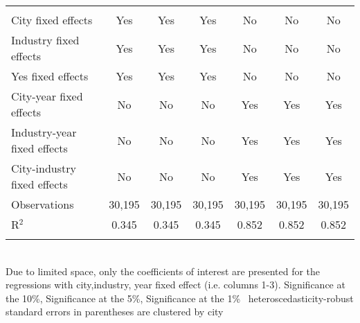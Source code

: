 \documentclass[12pt]{article}
\begin{document}
\begin{table}[!htbp]
\begin{adjustbox}{width=\textwidth, totalheight=\baselineskip,keepaspectratio}
\begin{tabular}{@{\extracolsep{5pt}}lcccccc}
 \hline \\[-1.8ex] 
City fixed effects & Yes & Yes & Yes & No & No & No \\ 
Industry fixed effects & Yes & Yes & Yes & No & No & No \\ 
Yes fixed effects & Yes & Yes & Yes & No & No & No \\ 
City-year fixed effects & No & No & No & Yes & Yes & Yes \\ 
Industry-year fixed effects & No & No & No & Yes & Yes & Yes \\ 
City-industry fixed effects & No & No & No & Yes & Yes & Yes \\ 
Observations & 30,195 & 30,195 & 30,195 & 30,195 & 30,195 & 30,195 \\ 
R$^{2}$ & 0.345 & 0.345 & 0.345 & 0.852 & 0.852 & 0.852 \\ 
\hline 
\hline \\[-1.8ex] 
\end{tabular}
\end{adjustbox}
\begin{tablenotes} 
 \small 
 \item \\ 
\footnotesize{
Due to limited space, only the coefficients of interest are presented 
for the regressions with city,industry, year fixed effect (i.e. columns 1-3).
\sym{*} Significance at the 10\%, \sym{**} Significance at the 5\%, \sym{***} Significance at the 1\% \
heteroscedasticity-robust standard errors in parentheses are clustered by city 
}
 
\end{tablenotes}
\end{table}
\end{document}
